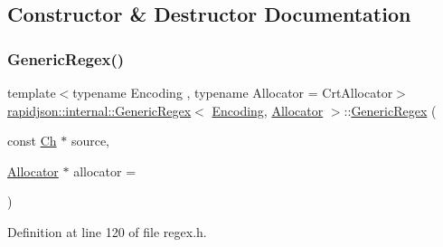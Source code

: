 \subsection{Constructor \& Destructor Documentation}
\mbox{\label{classrapidjson_1_1internal_1_1_generic_regex_af02ff56acbfdd2191f98de551794d215}} 
\subsubsection{\texorpdfstring{GenericRegex()}{GenericRegex()}}
{\footnotesize\ttfamily template$<$typename Encoding , typename Allocator  = Crt\+Allocator$>$ \\
\mbox{\hyperlink{classrapidjson_1_1internal_1_1_generic_regex}{rapidjson\+::internal\+::\+Generic\+Regex}}$<$ \mbox{\hyperlink{classrapidjson_1_1_encoding}{Encoding}}, \mbox{\hyperlink{classrapidjson_1_1_allocator}{Allocator}} $>$\+::\mbox{\hyperlink{classrapidjson_1_1internal_1_1_generic_regex}{Generic\+Regex}} (\begin{DoxyParamCaption}\item[{const \mbox{\hyperlink{classrapidjson_1_1internal_1_1_generic_regex_a14c4770316f826aa03ee393ec218fe3d}{Ch}} $\ast$}]{source,  }\item[{\mbox{\hyperlink{classrapidjson_1_1_allocator}{Allocator}} $\ast$}]{allocator = {} }\end{DoxyParamCaption})}



Definition at line 120 of file regex.\+h.


